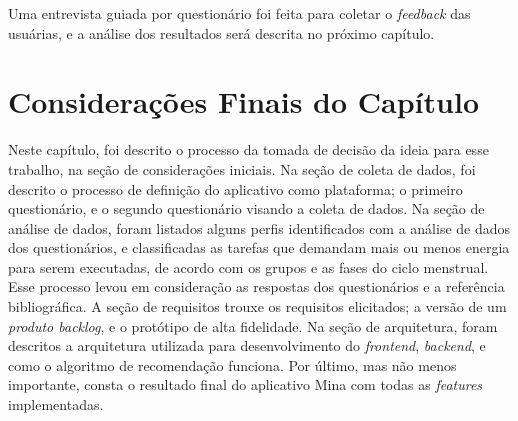 Uma entrevista guiada por questionário foi feita para coletar o \emph{feedback} das usuárias, e a análise 
dos resultados será descrita no próximo capítulo. 


\section{Considerações Finais do Capítulo}

Neste capítulo, foi descrito o processo da tomada de decisão 
da ideia para 
esse trabalho, na seção de considerações iniciais. Na seção 
de coleta de dados, 
foi descrito o processo de definição do aplicativo como 
plataforma; o primeiro questionário, e o segundo questionário 
visando a coleta de dados. Na seção de análise de dados, foram 
listados alguns perfis identificados 
com a análise de dados dos questionários, e classificadas as 
tarefas que demandam mais ou menos energia 
para serem executadas, de acordo com os grupos e as fases do ciclo menstrual. 
Esse processo levou em consideração 
as respostas dos questionários e a referência bibliográfica. 
A seção de requisitos trouxe os requisitos elicitados;  
a versão de um \emph{produto backlog}, e o protótipo de alta fidelidade. 
Na seção de arquitetura, foram descritos a arquitetura utilizada para desenvolvimento do 
\emph{frontend}, \emph{backend}, e como o algoritmo de recomendação funciona. Por último, 
mas não menos importante, consta o resultado final do aplicativo Mina com todas as \emph{features} 
implementadas.
